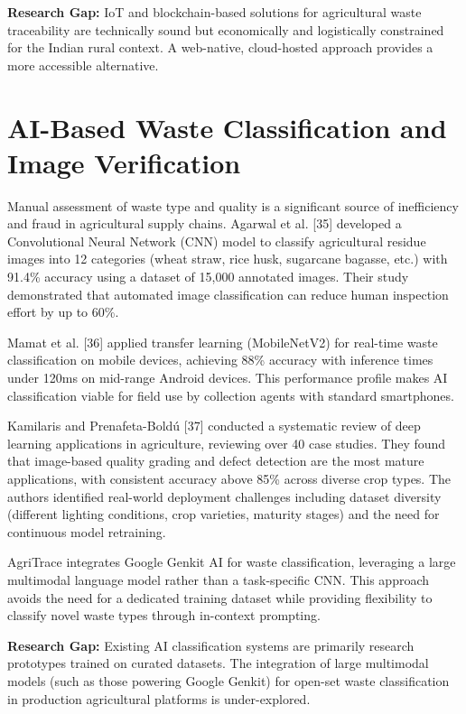 \documentclass[a4paper,12pt,oneside]{report}
\begin{document}
\textbf{Research Gap:} IoT and blockchain-based solutions for agricultural waste traceability are technically sound but economically and logistically constrained for the Indian rural context. A web-native, cloud-hosted approach provides a more accessible alternative.

\section{AI-Based Waste Classification and Image Verification}

\noindent Manual assessment of waste type and quality is a significant source of inefficiency and fraud in agricultural supply chains. Agarwal et al. [35] developed a Convolutional Neural Network (CNN) model to classify agricultural residue images into 12 categories (wheat straw, rice husk, sugarcane bagasse, etc.) with 91.4\% accuracy using a dataset of 15,000 annotated images. Their study demonstrated that automated image classification can reduce human inspection effort by up to 60\%.

Mamat et al. [36] applied transfer learning (MobileNetV2) for real-time waste classification on mobile devices, achieving 88\% accuracy with inference times under 120ms on mid-range Android devices. This performance profile makes AI classification viable for field use by collection agents with standard smartphones.

Kamilaris and Prenafeta-Bold{\'u} [37] conducted a systematic review of deep learning applications in agriculture, reviewing over 40 case studies. They found that image-based quality grading and defect detection are the most mature applications, with consistent accuracy above 85\% across diverse crop types. The authors identified real-world deployment challenges including dataset diversity (different lighting conditions, crop varieties, maturity stages) and the need for continuous model retraining.

AgriTrace integrates Google Genkit AI for waste classification, leveraging a large multimodal language model rather than a task-specific CNN. This approach avoids the need for a dedicated training dataset while providing flexibility to classify novel waste types through in-context prompting.

\textbf{Research Gap:} Existing AI classification systems are primarily research prototypes trained on curated datasets. The integration of large multimodal models (such as those powering Google Genkit) for open-set waste classification in production agricultural platforms is under-explored.
\end{document}
